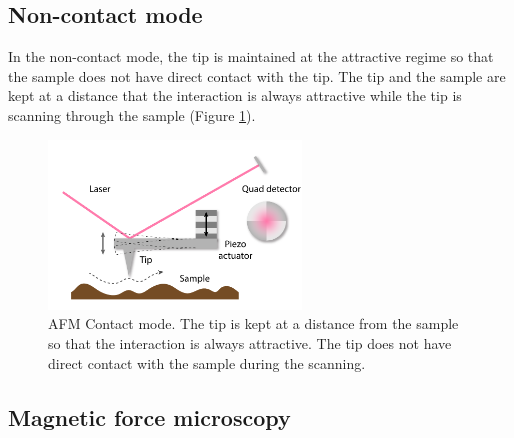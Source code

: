 \documentclass[pdflatex, sectionletters, 12pt]{pittetd}    %
\begin{document}
\subsection{Non-contact mode}

In the non-contact mode, the tip is maintained at the attractive regime so that the sample does not have direct contact with the tip. The tip and the sample are kept at a distance that the interaction is always attractive while the tip is scanning through the sample (Figure \ref{FIG:NonContactAFM}). 
\\

\begin{figure}[h!]
	\centering
	\includegraphics[width=0.6\textwidth]{Drawing/NonContactAFM.pdf}
	\caption{AFM Contact mode. The tip is kept at a distance from the sample so that the interaction is always attractive. The tip does not have direct contact with the sample during the scanning.}
	\label{FIG:NonContactAFM}
\end{figure}

\subsection{Magnetic force microscopy}
\label{SEC:AFMMFM}
\end{document}
